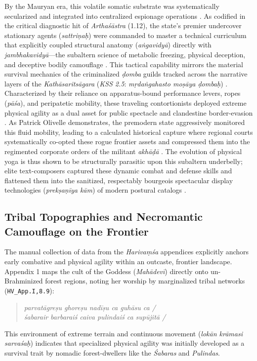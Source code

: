 \documentclass[11pt,letterpaper]{article}
\begin{document}
By the Mauryan era, this volatile somatic substrate was systematically secularized and integrated into centralized espionage operations \cite{McCartney2026b}. As codified in the critical diagnostic hit of \textit{Arthaśāstra} (1.12), the state's premier undercover stationary agents (\textit{sattriṇaḥ}) were commanded to master a technical curriculum that explicitly coupled structural anatomy (\textit{aṅgavidyā}) directly with \textit{jambhakavidyā}---the subaltern science of metabolic freezing, physical deception, and deceptive bodily camouflage \cite{McCartney2026b}. This tactical capability mirrors the material survival mechanics of the criminalized \textit{ḍomba} guilds tracked across the narrative layers of the \textit{Kathāsaritsāgara} (\textit{KSS 2.5}: \textit{mṛdaṅgahasto moṣāya ḍombaḥ}) \cite{McCartney2026}. Characterized by their reliance on apparatus-bound performance levers, ropes (\textit{pāśa}), and peripatetic mobility, these traveling contortionists deployed extreme physical agility as a dual asset for public spectacle and clandestine border-evasion \cite{McCartney2026, McCartney2026b}. As Patrick Olivelle demonstrates, the premodern state aggressively monitored this fluid mobility, leading to a calculated historical capture where regional courts systematically co-opted these rogue frontier assets and compressed them into the regimented corporate orders of the militant \textit{akhāḍā} \cite{Clark2006, Olivelle1987}. The evolution of physical yoga is thus shown to be structurally parasitic upon this subaltern underbelly; elite text-composers captured these dynamic combat and defense skills and flattened them into the sanitized, respectably bourgeois spectacular display technologies (\textit{prekṣaṇīya kām}) of modern postural catalogs \cite{Birch2024, Danta2015}.


\subsection{Tribal Topographies and Necromantic Camouflage on the Frontier}
The manual collection of data from the \textit{Harivaṃśa} appendices explicitly anchors early combative and physical agility within an outcaste, frontier landscape. Appendix 1 maps the cult of the Goddess (\textit{Mahādevī}) directly onto un-Brahminized forest regions, noting her worship by marginalized tribal networks (\texttt{HV\_App.I,8.9}):
\begin{quotation}
\noindent \textit{parvatāgreṣu ghoreṣu nadīṣu ca guhāsu ca /} \\
\noindent \textit{śabarair barbaraiś caiva pulindaiś ca supūjitā /}
\end{quotation}
This environment of extreme terrain and continuous movement (\textit{lokān krāmasi sarvaśaḥ}) indicates that specialized physical agility was initially developed as a survival trait by nomadic forest-dwellers like the \textit{Śabaras} and \textit{Pulindas}. 
\end{document}
